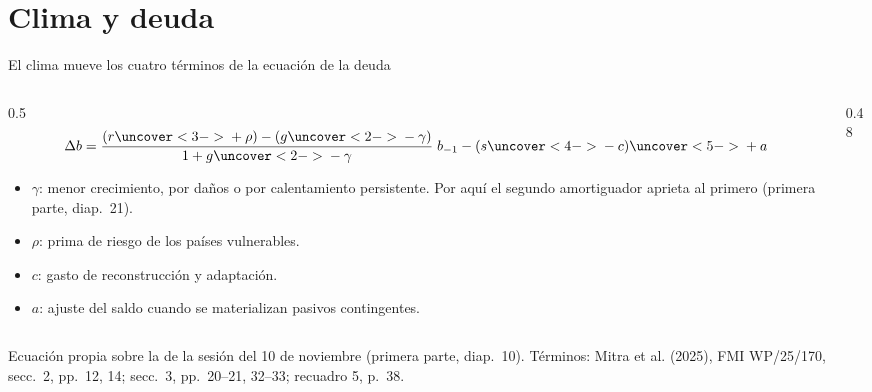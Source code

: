 \documentclass[aspectratio=169,11pt]{beamer}
\newcommand{\fuente}[1]{\par\vfill{\small\color{cGris}#1\par}}
\newcommand{\FMI}{Mitra et al. (2025), FMI WP/25/170}
\begin{document}
\section{Clima y deuda}

\begin{frame}{El clima mueve los cuatro términos de la ecuación de la deuda}
  \begin{columns}[T]
    \begin{column}{0.5\textwidth}
      \[ \Delta b = \frac{(r\uncover<3->{{}+\rho}) - (g\uncover<2->{{}-\gamma})}{1+g\uncover<2->{{}-\gamma}}\; b_{-1} - (s\uncover<4->{{}-c}) \uncover<5->{{}+ a} \]
      \small
      \begin{itemize}
        \item<2-> $\gamma$: menor crecimiento, por daños o por calentamiento persistente. Por aquí el segundo amortiguador aprieta al primero (primera parte, diap.~21).
        \item<3-> $\rho$: prima de riesgo de los países vulnerables.
        \item<4-> $c$: gasto de reconstrucción y adaptación.
        \item<5-> $a$: ajuste del saldo cuando se materializan pasivos contingentes.
      \end{itemize}
    \end{column}
    \begin{column}{0.48\textwidth}
      \small
    \end{column}
  \end{columns}
  \fuente{Ecuación propia sobre la de la sesión del 10 de noviembre (primera parte, diap.~10). Términos: \FMI, secc.~2, pp.~12, 14; secc.~3, pp.~20--21, 32--33; recuadro 5, p.~38.}
\end{frame}
\end{document}
